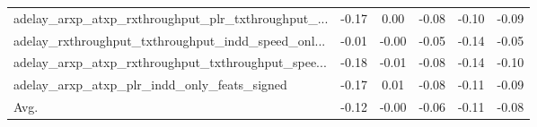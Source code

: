 \begin{tabular}{|l|*{4}{c}|r|}
adelay\_arxp\_atxp\_rxthroughput\_plr\_txthroughput\_... & -0.17 &  0.00 &   -0.08 &      -0.10 & -0.09 \\
adelay\_rxthroughput\_txthroughput\_indd\_speed\_onl... & -0.01 & -0.00 &   -0.05 &      -0.14 & -0.05 \\
adelay\_arxp\_atxp\_rxthroughput\_txthroughput\_spee... & -0.18 & -0.01 &   -0.08 &      -0.14 & -0.10 \\
adelay\_arxp\_atxp\_plr\_indd\_only\_feats\_signed        & -0.17 &  0.01 &   -0.08 &      -0.11 & -0.09 \\
\hline
Avg.                                               & -0.12 & -0.00 &   -0.06 &      -0.11 & -0.08 \\
\bottomrule
\end{tabular}
